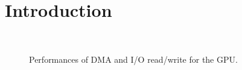\section{Introduction}
\label{sec:introduction}

\begin{figure}[!t]
 \centering
 \\
 \caption{Performances of DMA and I/O read/write for the GPU.}
 \label{fig:intro_data_transfer}
\end{figure}
